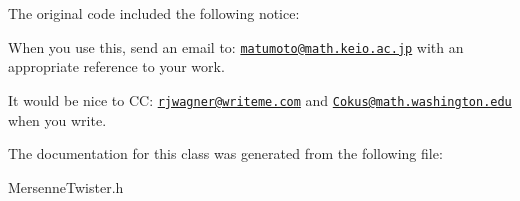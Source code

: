 The original code included the following notice:

When you use this, send an email to: \href{mailto:matumoto@math.keio.ac.jp}{\tt matumoto@math.keio.ac.jp} with an appropriate reference to your work.

It would be nice to CC: \href{mailto:rjwagner@writeme.com}{\tt rjwagner@writeme.com} and \href{mailto:Cokus@math.washington.edu}{\tt Cokus@math.washington.edu} when you write. 

The documentation for this class was generated from the following file:\begin{DoxyCompactItemize}
\item 
MersenneTwister.h\end{DoxyCompactItemize}
